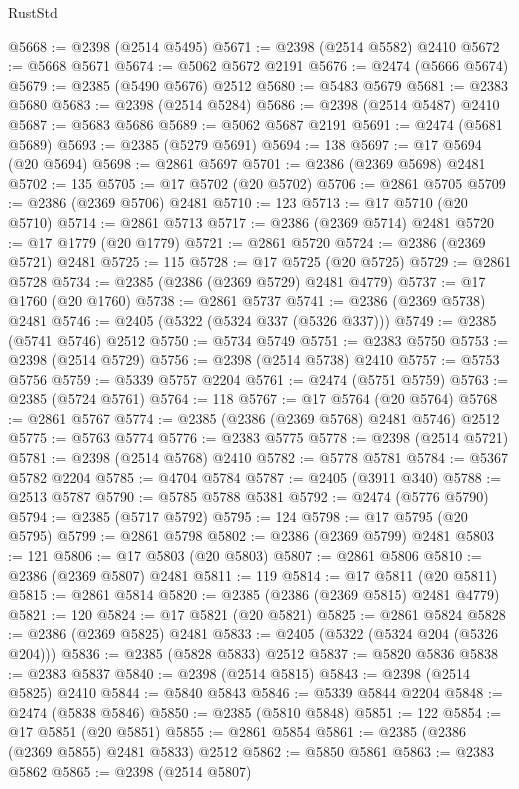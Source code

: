 \begin{lexlean}{RustStd}
\begin{coremodule}
@5668 := @2398 (@2514 @5495)
@5671 := @2398 (@2514 @5582) @2410
@5672 := @5668 @5671
@5674 := @5062 @5672 @2191
@5676 := @2474 (@5666 @5674)
@5679 := @2385 (@5490 @5676) @2512
@5680 := @5483 @5679
@5681 := @2383 @5680
@5683 := @2398 (@2514 @5284)
@5686 := @2398 (@2514 @5487) @2410
@5687 := @5683 @5686
@5689 := @5062 @5687 @2191
@5691 := @2474 (@5681 @5689)
@5693 := @2385 (@5279 @5691)
@5694 := 138
@5697 := @17 @5694 (@20 @5694)
@5698 := @2861 @5697
@5701 := @2386 (@2369 @5698) @2481
@5702 := 135
@5705 := @17 @5702 (@20 @5702)
@5706 := @2861 @5705
@5709 := @2386 (@2369 @5706) @2481
@5710 := 123
@5713 := @17 @5710 (@20 @5710)
@5714 := @2861 @5713
@5717 := @2386 (@2369 @5714) @2481
@5720 := @17 @1779 (@20 @1779)
@5721 := @2861 @5720
@5724 := @2386 (@2369 @5721) @2481
@5725 := 115
@5728 := @17 @5725 (@20 @5725)
@5729 := @2861 @5728
@5734 := @2385 (@2386 (@2369 @5729) @2481 @4779)
@5737 := @17 @1760 (@20 @1760)
@5738 := @2861 @5737
@5741 := @2386 (@2369 @5738) @2481
@5746 := @2405 (@5322 (@5324 @337 (@5326 @337)))
@5749 := @2385 (@5741 @5746) @2512
@5750 := @5734 @5749
@5751 := @2383 @5750
@5753 := @2398 (@2514 @5729)
@5756 := @2398 (@2514 @5738) @2410
@5757 := @5753 @5756
@5759 := @5339 @5757 @2204
@5761 := @2474 (@5751 @5759)
@5763 := @2385 (@5724 @5761)
@5764 := 118
@5767 := @17 @5764 (@20 @5764)
@5768 := @2861 @5767
@5774 := @2385 (@2386 (@2369 @5768) @2481 @5746) @2512
@5775 := @5763 @5774
@5776 := @2383 @5775
@5778 := @2398 (@2514 @5721)
@5781 := @2398 (@2514 @5768) @2410
@5782 := @5778 @5781
@5784 := @5367 @5782 @2204
@5785 := @4704 @5784
@5787 := @2405 (@3911 @340)
@5788 := @2513 @5787
@5790 := @5785 @5788 @5381
@5792 := @2474 (@5776 @5790)
@5794 := @2385 (@5717 @5792)
@5795 := 124
@5798 := @17 @5795 (@20 @5795)
@5799 := @2861 @5798
@5802 := @2386 (@2369 @5799) @2481
@5803 := 121
@5806 := @17 @5803 (@20 @5803)
@5807 := @2861 @5806
@5810 := @2386 (@2369 @5807) @2481
@5811 := 119
@5814 := @17 @5811 (@20 @5811)
@5815 := @2861 @5814
@5820 := @2385 (@2386 (@2369 @5815) @2481 @4779)
@5821 := 120
@5824 := @17 @5821 (@20 @5821)
@5825 := @2861 @5824
@5828 := @2386 (@2369 @5825) @2481
@5833 := @2405 (@5322 (@5324 @204 (@5326 @204)))
@5836 := @2385 (@5828 @5833) @2512
@5837 := @5820 @5836
@5838 := @2383 @5837
@5840 := @2398 (@2514 @5815)
@5843 := @2398 (@2514 @5825) @2410
@5844 := @5840 @5843
@5846 := @5339 @5844 @2204
@5848 := @2474 (@5838 @5846)
@5850 := @2385 (@5810 @5848)
@5851 := 122
@5854 := @17 @5851 (@20 @5851)
@5855 := @2861 @5854
@5861 := @2385 (@2386 (@2369 @5855) @2481 @5833) @2512
@5862 := @5850 @5861
@5863 := @2383 @5862
@5865 := @2398 (@2514 @5807)

\end{coremodule}
\end{lexlean}
